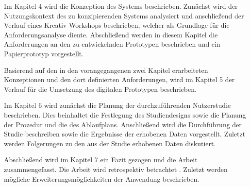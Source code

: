 Im Kapitel 4 wird die Konzeption des Systems beschrieben. Zunächst wird der Nutzungskontext des zu konzipierenden Systems analysiert und 
anschließend der Verlauf eines Kreativ Workshops beschrieben, welcher als Grundlage für die Anforderungsanalyse diente. Abschließend werden in diesem Kapitel 
die Anforderungen an den zu entwickelnden Prototypen beschrieben und ein Papierprototyp vorgestellt. 

Basierend auf den in den vorangegangenen zwei Kapitel erarbeiteten Konzeptionen und den dort definierten Anforderungen, wird im Kapitel 5 der Verlauf für die 
Umsetzung des digitalen Prototypen beschrieben.      

Im Kapitel 6 wird zunächst die Planung der durchzuführenden Nutzerstudie beschrieben. Dies beinhaltet die Festlegung des Studiendesigns sowie die Planung der Prozedur und die des Ablaufplans. 
Anschließend wird die Durchführung der Studie beschreiben sowie die Ergebnisse der erhobenen Daten vorgestellt. Zuletzt werden Folgerungen zu den aus der Studie erhobenen Daten diskutiert.

Abschließend wird im Kapitel 7 ein Fazit gezogen und die Arbeit zusammengefasst. Die Arbeit wird retrospektiv betrachtet . 
Zuletzt werden mögliche Erweiterungsmöglichkeiten der Anwendung beschrieben. 